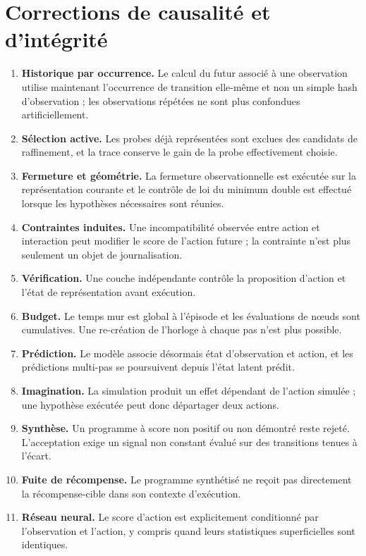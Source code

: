\documentclass[11pt,a4paper]{article}
\begin{document}
\section{Corrections de causalité et d'intégrité}
\begin{enumerate}
\item \textbf{Historique par occurrence.} Le calcul du futur associé à une observation utilise maintenant l'occurrence de transition elle-même et non un simple hash d'observation ; les observations répétées ne sont plus confondues artificiellement.
\item \textbf{Sélection active.} Les probes déjà représentées sont exclues des candidats de raffinement, et la trace conserve le gain de la probe effectivement choisie.
\item \textbf{Fermeture et géométrie.} La fermeture observationnelle est exécutée sur la représentation courante et le contrôle de loi du minimum double est effectué lorsque les hypothèses nécessaires sont réunies.
\item \textbf{Contraintes induites.} Une incompatibilité observée entre action et interaction peut modifier le score de l'action future ; la contrainte n'est plus seulement un objet de journalisation.
\item \textbf{Vérification.} Une couche indépendante contrôle la proposition d'action et l'état de représentation avant exécution.
\item \textbf{Budget.} Le temps mur est global à l'épisode et les évaluations de nœuds sont cumulatives. Une re-création de l'horloge à chaque pas n'est plus possible.
\item \textbf{Prédiction.} Le modèle associe désormais état d'observation et action, et les prédictions multi-pas se poursuivent depuis l'état latent prédit.
\item \textbf{Imagination.} La simulation produit un effet dépendant de l'action simulée ; une hypothèse exécutée peut donc départager deux actions.
\item \textbf{Synthèse.} Un programme à score non positif ou non démontré reste rejeté. L'acceptation exige un signal non constant évalué sur des transitions tenues à l'écart.
\item \textbf{Fuite de récompense.} Le programme synthétisé ne reçoit pas directement la récompense-cible dans son contexte d'exécution.
\item \textbf{Réseau neural.} Le score d'action est explicitement conditionné par l'observation et l'action, y compris quand leurs statistiques superficielles sont identiques.

\end{enumerate}
\end{document}

